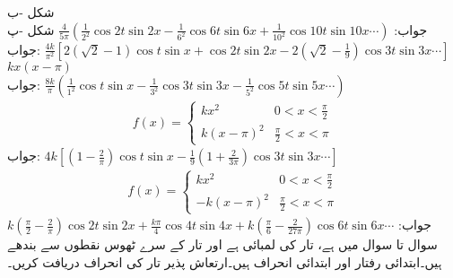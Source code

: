 \quad شکل -ب \\
جواب:\quad
$\tfrac{4}{5\pi}(\tfrac{1}{2^2}\cos 2t\sin 2x-\tfrac{1}{6^2}\cos 6t\sin 6x+\tfrac{1}{10^2}\cos 10t\sin 10x\cdots)$
\quad شکل -پ\\
جواب:\quad
$\tfrac{4k}{\pi^2}[2(\sqrt{2}-1)\cos t\sin x +\cos 2t\sin 2x-2(\sqrt{2}-\tfrac{1}{9})\cos 3t\sin 3x\cdots]$
\quad
$kx(x-\pi)$\\
جواب:\quad
$\tfrac{8k}{\pi}(\tfrac{1}{1^2}\cos t\sin x-\tfrac{1}{3^2}\cos 3t\sin 3x-\tfrac{1}{5^2}\cos 5t\sin 5x\cdots)$
\quad 
\begin{align*}
f(x)=
\begin{cases}
kx^2&0<x<\frac{\pi}{2}\\
k(x-\pi)^2&\frac{\pi}{2}<x<\pi
\end{cases}
\end{align*}
جواب:\quad
$4k[(1-\tfrac{2}{\pi})\cos t\sin x-\tfrac{1}{9}(1+\tfrac{2}{3\pi})\cos 3t\sin 3x\cdots]$
\quad 
\begin{align*}
f(x)=
\begin{cases}
kx^2&0<x<\frac{\pi}{2}\\
-k(x-\pi)^2&\frac{\pi}{2}<x<\pi
\end{cases}
\end{align*}
جواب:\quad
$k(\tfrac{\pi}{2}-\tfrac{2}{\pi})\cos 2t\sin 2x+\tfrac{k\pi}{4}\cos 4t\sin 4x+k(\tfrac{\pi}{6}-\tfrac{2}{27\pi})\cos 6t\sin 6x\cdots$
سوال  تا سوال  میں  ہے، تار کی لمبائی  ہے اور تار کے سرے ٹھوس نقطوں سے بندھے ہیں۔ابتدائی رفتار  اور ابتدائی انحراف  ہیں۔ارتعاش پذیر تار کی انحراف  دریافت کریں۔

